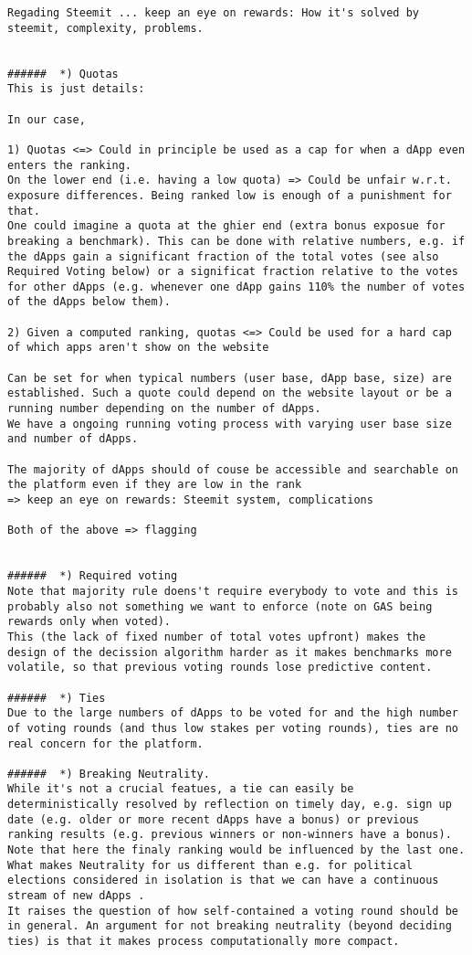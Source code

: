 {{\begin{verbatim}
Regading Steemit ... keep an eye on rewards: How it's solved by steemit, complexity, problems.


######  *) Quotas
This is just details: 

In our case, 

1) Quotas <=> Could in principle be used as a cap for when a dApp even enters the ranking. 
On the lower end (i.e. having a low quota) => Could be unfair w.r.t. exposure differences. Being ranked low is enough of a punishment for that.
One could imagine a quota at the ghier end (extra bonus exposue for breaking a benchmark). This can be done with relative numbers, e.g. if the dApps gain a significant fraction of the total votes (see also Required Voting below) or a significat fraction relative to the votes for other dApps (e.g. whenever one dApp gains 110% the number of votes of the dApps below them).

2) Given a computed ranking, quotas <=> Could be used for a hard cap of which apps aren't show on the website

Can be set for when typical numbers (user base, dApp base, size) are established. Such a quote could depend on the website layout or be a running number depending on the number of dApps.
We have a ongoing running voting process with varying user base size and number of dApps.

The majority of dApps should of couse be accessible and searchable on the platform even if they are low in the rank
=> keep an eye on rewards: Steemit system, complications

Both of the above => flagging


######  *) Required voting
Note that majority rule doens't require everybody to vote and this is probably also not something we want to enforce (note on GAS being rewards only when voted). 
This (the lack of fixed number of total votes upfront) makes the design of the decission algorithm harder as it makes benchmarks more volatile, so that previous voting rounds lose predictive content.

######  *) Ties
Due to the large numbers of dApps to be voted for and the high number of voting rounds (and thus low stakes per voting rounds), ties are no real concern for the platform.

######  *) Breaking Neutrality.
While it's not a crucial featues, a tie can easily be deterministically resolved by reflection on timely day, e.g. sign up date (e.g. older or more recent dApps have a bonus) or previous ranking results (e.g. previous winners or non-winners have a bonus). Note that here the finaly ranking would be influenced by the last one.
What makes Neutrality for us different than e.g. for political elections considered in isolation is that we can have a continuous stream of new dApps .
It raises the question of how self-contained a voting round should be in general. An argument for not breaking neutrality (beyond deciding ties) is that it makes process computationally more compact.


\end{verbatim}}}
